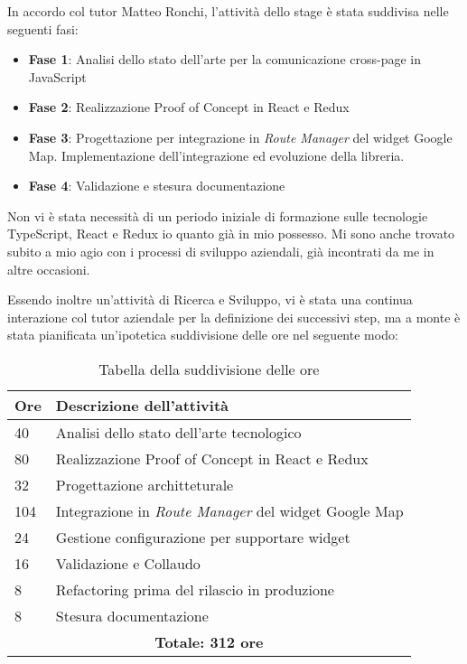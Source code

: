 In accordo col tutor Matteo Ronchi, l'attività dello stage è stata suddivisa nelle seguenti fasi:

\begin{itemize}
    \item \textbf{Fase 1}: Analisi dello stato dell'arte per la comunicazione cross-page in JavaScript
    \item \textbf{Fase 2}: Realizzazione Proof of Concept in React e Redux
    \item \textbf{Fase 3}: Progettazione per integrazione in \textit{Route Manager} del widget Google Map. Implementazione dell'integrazione ed evoluzione della libreria.
    \item \textbf{Fase 4}: Validazione e stesura documentazione
\end{itemize}

Non vi è stata necessità di un periodo iniziale di formazione sulle tecnologie TypeScript, React e Redux io quanto già in mio possesso. Mi sono anche trovato subito a mio agio con i processi di sviluppo aziendali, già incontrati da me in altre occasioni.

Essendo inoltre un'attività di Ricerca e Sviluppo, vi è stata una continua interazione col tutor aziendale per la definizione dei successivi step, ma a monte è stata pianificata un'ipotetica suddivisione delle ore nel seguente modo: \\

\begin{table}[H]
\begin{tabular}{ |p{2cm} |p{10cm}|}
\hline
\textbf{Ore} & \textbf{Descrizione dell'attività} \\ \hline

40 & Analisi dello stato dell'arte tecnologico \\ \hline
80 & Realizzazione Proof of Concept in React e Redux \\ \hline
32 & Progettazione architteturale \\ \hline
104 & Integrazione in \textit{Route Manager} del widget Google Map \\ \hline
24 & Gestione configurazione per supportare widget \\ \hline
16 & Validazione e Collaudo \\ \hline
8 & Refactoring prima del rilascio in produzione \\ \hline
8 & Stesura documentazione \\ \hline

\multicolumn{2}{|c|}{\textbf{Totale: 312 ore}} \\ \hline

\end{tabular}
\caption{Tabella della suddivisione delle ore}
\end{table}


